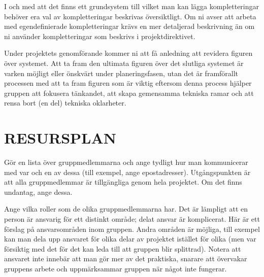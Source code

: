 \documentclass[a4paper]{article}
\begin{document}
I och med att det finns ett grundsystem till vilket man kan lägga
kompletteringar behöver era val av kompletteringar beskrivas
översiktligt. Om ni avser att arbeta med egendefinierade kompletteringar
krävs en mer detaljerad beskrivning än om ni använder kompletteringar
som beskrivs i projektdirektivet.

Under projektets genomförande kommer ni att få anledning att revidera
figuren över systemet. Att ta fram den ultimata figuren över det
slutliga systemet är varken möjligt eller önskvärt under
planeringsfasen, utan det är framförallt processen med att ta fram
figuren som är viktig eftersom denna process hjälper gruppen att
fokusera tänkandet, att skapa gemensamma tekniska ramar och att rensa
bort (en del) tekniska oklarheter.



\section{RESURSPLAN}
\label{sec:RESURSPLAN}


Gör en lista över gruppmedlemmarna och ange tydligt hur man kommunicerar
med var och en av dessa (till exempel, ange epostadresser).
Utgångspunkten är att alla gruppmedlemmar är tillgängliga genom hela
projektet. Om det finns undantag, ange dessa.

Ange vilka roller som de olika gruppmedlemmarna har. Det är lämpligt att
en person är ansvarig för ett distinkt område; delat ansvar är
komplicerat. Här är ett förslag på ansvarsområden inom gruppen. Andra
områden är möjliga, till exempel kan man dela upp ansvaret för olika
delar av projektet istället för olika (men var försiktig med det för det
kan leda till att gruppen blir splittrad). Notera att ansvaret inte
innebär att man gör mer av det praktiska, snarare att övervakar gruppens
arbete och uppmärksammar gruppen när något inte fungerar.
\end{document}
